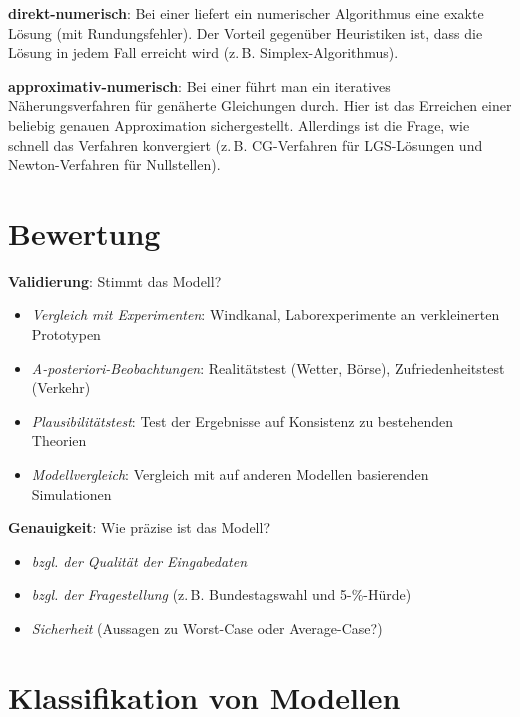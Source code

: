 \textbf{direkt-numerisch}:
Bei einer  liefert ein numerischer Algorithmus eine exakte
Lösung (mit Rundungsfehler).
Der Vorteil gegenüber Heuristiken ist, dass die Lösung in jedem Fall erreicht wird
(z.\,B. Simplex-Algorithmus).

\textbf{approximativ-numerisch}:
Bei einer  führt man ein iteratives Näherungsverfahren
für genäherte Gleichungen durch.
Hier ist das Erreichen einer beliebig genauen Approximation sichergestellt.
Allerdings ist die Frage, wie schnell das Verfahren konvergiert
(z.\,B. CG-Verfahren für LGS-Lösungen und Newton-Verfahren für Nullstellen).

\pagebreak

\section{%
    Bewertung%
}

\textbf{Validierung}:
Stimmt das Modell?
\begin{itemize}
    \item
    \emph{Vergleich mit Experimenten}:
    Windkanal,
    Laborexperimente an verkleinerten Prototypen

    \item
    \emph{A-posteriori-Beobachtungen}:
    Realitätstest (Wetter, Börse),
    Zufriedenheitstest (Verkehr)

    \item
    \emph{Plausibilitätstest}:
    Test der Ergebnisse auf Konsistenz zu bestehenden Theorien

    \item
    \emph{Modellvergleich}:
    Vergleich mit auf anderen Modellen basierenden Simulationen
\end{itemize}

\textbf{Genauigkeit}:
Wie präzise ist das Modell?
\begin{itemize}
    \item
    \emph{bzgl. der Qualität der Eingabedaten}

    \item
    \emph{bzgl. der Fragestellung}
    (z.\,B. Bundestagswahl und 5-\%-Hürde)

    \item
    \emph{Sicherheit}
    (Aussagen zu Worst-Case oder Average-Case?)
\end{itemize}

\section{%
    Klassifikation von Modellen%
}

